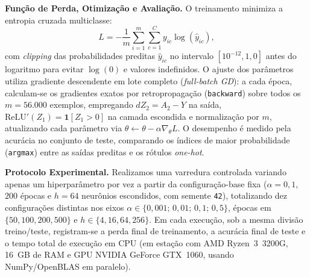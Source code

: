 \noindent\textbf{Função de Perda, Otimização e Avaliação.}
O treinamento minimiza a entropia cruzada multiclasse:
\[
L = -\frac{1}{m}\sum_{i=1}^{m}\sum_{c=1}^{C} y_{ic}\log(\hat{y}_{ic}),
\]
com \emph{clipping} das probabilidades preditas $\hat{y}_{ic}$ no intervalo $[10^{-12}, 1{,}0]$ antes do logaritmo para evitar $\log(0)$ e valores indefinidos. O ajuste dos parâmetros utiliza gradiente descendente em lote completo (\emph{full-batch GD}): a cada época, calculam-se os gradientes exatos por retropropagação (\texttt{backward}) sobre todos os $m = 56.000$ exemplos, empregando $dZ_2 = A_2 - Y$ na saída, $\text{ReLU}'(Z_1) = \mathbf{1}[Z_1 > 0]$ na camada escondida e normalização por $m$, atualizando cada parâmetro via $\theta \leftarrow \theta - \alpha \nabla_\theta L$. O desempenho é medido pela acurácia no conjunto de teste, comparando os índices de maior probabilidade (\texttt{argmax}) entre as saídas preditas e os rótulos \emph{one-hot}.

\noindent\textbf{Protocolo Experimental.}
Realizamos uma varredura controlada variando apenas um hiperparâmetro por vez a partir da configuração-base fixa ($\alpha = 0{,}1$, $200$ épocas e $h = 64$ neurônios escondidos, com semente \texttt{42}), totalizando dez configurações distintas nos eixos $\alpha \in \{0{,}001;\, 0{,}01;\, 0{,}1;\, 0{,}5\}$, épocas em $\{50, 100, 200, 500\}$ e $h \in \{4, 16, 64, 256\}$. Em cada execução, sob a mesma divisão treino/teste, registram-se a perda final de treinamento, a acurácia final de teste e o tempo total de execução em CPU (em estação com AMD Ryzen~3~3200G, 16~GB de RAM e GPU NVIDIA GeForce GTX~1060, usando NumPy/OpenBLAS em paralelo).
